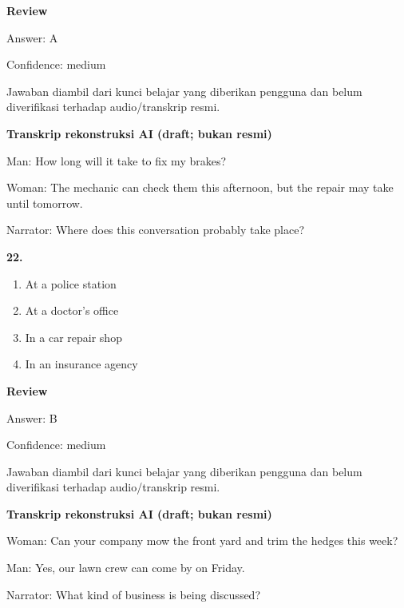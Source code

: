 \documentclass[12pt]{article}
\begin{document}
\par
\begingroup
\setlength{\parskip}{0pt}
\setlength{\parindent}{0pt}
\textbf{Review}\par
Answer: A\par
Confidence: medium\par
Jawaban diambil dari kunci belajar yang diberikan pengguna dan belum diverifikasi terhadap audio/transkrip resmi.\par
\endgroup
\par
\vspace{0.25\baselineskip}
\begin{exampleblock}
\textbf{Transkrip rekonstruksi AI (draft; bukan resmi)}\par
Man: How long will it take to fix my brakes?\par
Woman: The mechanic can check them this afternoon, but the repair may take until tomorrow.\par
Narrator: Where does this conversation probably take place?\par
\end{exampleblock}
\noindent\textbf{22.}
\begin{enumerate}[label=(\Alph*),leftmargin=*,itemsep=0.2em]
\item At a police station
\item At a doctor's office
\item In a car repair shop
\item In an insurance agency
\end{enumerate}
\par
\begingroup
\setlength{\parskip}{0pt}
\setlength{\parindent}{0pt}
\textbf{Review}\par
Answer: B\par
Confidence: medium\par
Jawaban diambil dari kunci belajar yang diberikan pengguna dan belum diverifikasi terhadap audio/transkrip resmi.\par
\endgroup
\par
\vspace{0.25\baselineskip}
\begin{exampleblock}
\textbf{Transkrip rekonstruksi AI (draft; bukan resmi)}\par
Woman: Can your company mow the front yard and trim the hedges this week?\par
Man: Yes, our lawn crew can come by on Friday.\par
Narrator: What kind of business is being discussed?\par
\end{exampleblock}
\end{document}
